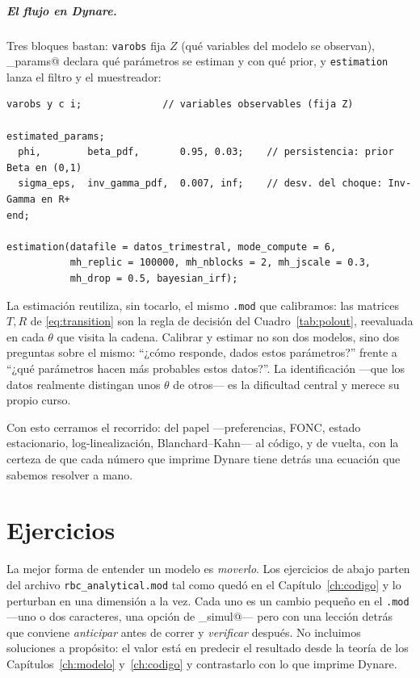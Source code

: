 \documentclass[11pt,a4paper]{report}
\newcounter{tcbrem}[section]
\renewcommand{\thetcbrem}{\thesection.\arabic{tcbrem}}
\newenvironment{remark}{%
  \refstepcounter{tcbrem}%
  \begin{tcolorbox}[remarkstyle, title={Observación~\thetcbrem}]}%
{\end{tcolorbox}}
\newcounter{ejer}
\newcommand{\code}[1]{\texttt{#1}}
\begin{document}
\paragraph{El flujo en Dynare.} Tres bloques bastan: \code{varobs} fija $Z$ (qué
variables del modelo se observan), \lstinline@estimated_params@ declara qué
parámetros se estiman y con qué prior, y \code{estimation} lanza el filtro y el
muestreador:

\begin{lstlisting}
varobs y c i;              // variables observables (fija Z)

estimated_params;
  phi,        beta_pdf,       0.95, 0.03;    // persistencia: prior Beta en (0,1)
  sigma_eps,  inv_gamma_pdf,  0.007, inf;    // desv. del choque: Inv-Gamma en R+
end;

estimation(datafile = datos_trimestral, mode_compute = 6,
           mh_replic = 100000, mh_nblocks = 2, mh_jscale = 0.3,
           mh_drop = 0.5, bayesian_irf);
\end{lstlisting}

\begin{remark}
La estimación reutiliza, sin tocarlo, el mismo \code{.mod} que calibramos: las
matrices $T,R$ de \eqref{eq:transition} son la regla de decisión del
Cuadro~\ref{tab:polout}, reevaluada en cada $\theta$ que visita la cadena. Calibrar
y estimar no son dos modelos, sino dos preguntas sobre el mismo: ``¿cómo responde,
dados estos parámetros?'' frente a ``¿qué parámetros hacen más probables estos
datos?''. La identificación ---que los datos realmente distingan unos $\theta$ de
otros--- es la dificultad central y merece su propio curso.
\end{remark}

\bigskip

Con esto cerramos el recorrido: del papel ---preferencias, FONC, estado
estacionario, log-linealización, Blanchard--Kahn--- al código, y de vuelta, con
la certeza de que cada número que imprime Dynare tiene detrás una ecuación que
sabemos resolver a mano.

\chapter{Ejercicios}
\label{ch:ejercicios}

La mejor forma de entender un modelo es \emph{moverlo}. Los ejercicios de abajo
parten del archivo \code{rbc\_analytical.mod} tal como quedó en el
Capítulo~\ref{ch:codigo} y lo perturban en una dimensión a la vez. Cada uno es un
cambio pequeño en el \code{.mod} ---uno o dos caracteres, una opción de
\lstinline@stoch_simul@--- pero con una lección detrás que conviene \emph{anticipar}
antes de correr y \emph{verificar} después. No incluimos soluciones a propósito: el
valor está en predecir el resultado desde la teoría de los Capítulos~\ref{ch:modelo}
y~\ref{ch:codigo} y contrastarlo con lo que imprime Dynare.
\end{document}
